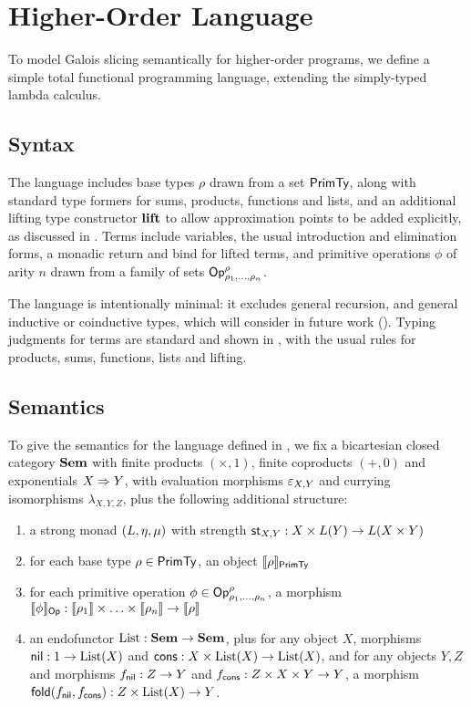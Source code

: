 \section{Higher-Order Language}
\label{sec:language}

To model Galois slicing semantically for higher-order programs, we define a simple total functional
programming language, extending the simply-typed lambda calculus.

\subsection{Syntax}
\label{sec:language:syntax}

The language includes base types $\rho$ drawn from a set $\mathsf{PrimTy}$, along with standard type formers for sums,
products, functions and lists, and an additional lifting type constructor $\mathbf{lift}$ to allow approximation
points to be added explicitly, as discussed in . Terms include variables, the
usual introduction and elimination forms, a monadic return and bind for lifted terms, and primitive operations
$\phi$ of arity $n$ drawn from a family of sets $\mathsf{Op}^\rho_{\rho_1,\ldots,\rho_n}$.

The language is intentionally minimal: it excludes general recursion, and general inductive or coinductive
types, which will consider in future work (). Typing judgments for terms are standard and
shown in , with the usual rules for products, sums, functions, lists and lifting.




\subsection{Semantics}
\label{sec:language:semantics}



To give the semantics for the language defined in , we fix a bicartesian closed
category $\mathbf{Sem}$ with finite products $(\times, 1)$, finite coproducts $(+, 0)$ and exponentials
$X \Rightarrow Y$, with evaluation morphisms $\varepsilon_{X,Y}$ and currying isomorphisms $\lambda_{X,Y,Z}$,
plus the following additional structure:
\begin{enumerate}
\item a strong monad $(L, \eta, \mu)$ with strength $\mathsf{st}_{X,Y}: X \times L(Y) \to L(X
\times Y)$
\item for each base type $\rho \in \mathsf{PrimTy}$, an object $\llbracket \rho \rrbracket_{\mathsf{PrimTy}}$
\item for each primitive operation $\phi \in \mathsf{Op}^\rho_{\rho_1,\ldots,\rho_n}$, a morphism
$\llbracket \phi \rrbracket_{\mathsf{Op}}: \llbracket \rho_1 \rrbracket \times \ldots \times \llbracket \rho_n \rrbracket \to \llbracket \rho \rrbracket$
\item an endofunctor $\mathrm{List}: \mathbf{Sem} \to \mathbf{Sem}$, plus for any object $X$, morphisms $\mathsf{nil}: 1 \to \mathrm{List}(X)$ and
$\mathsf{cons}: X \times \mathrm{List}(X) \to \mathrm{List}(X)$, and for any objects $Y, Z$ and morphisms $f_{\mathsf{nil}}: Z \to Y$ and
$f_{\mathsf{cons}}: Z \times X \times Y \to Y$, a morphism $\mathsf{fold}(f_{\mathsf{nil}},f_{\mathsf{cons}}): Z \times \mathrm{List}(X) \to Y$.
\end{enumerate}


